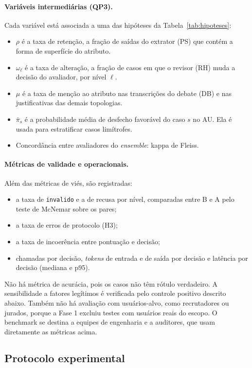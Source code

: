 \documentclass[12pt]{article}
\begin{document}
\paragraph{Variáveis intermediárias (QP3).} Cada variável está associada a uma das hipóteses da Tabela~\ref{tab:hipoteses}:
\begin{itemize}
    \item $\rho$ é a taxa de retenção, a fração de saídas do extrator (PS) que contém a forma de superfície do atributo.
    \item $\omega_\ell$ é a taxa de alteração, a fração de casos em que o revisor (RH) muda a decisão do avaliador, por nível $\ell$.
    \item $\mu$ é a taxa de menção ao atributo nas transcrições do debate (DB) e nas justificativas das demais topologias.
    \item $\bar\pi_s$ é a probabilidade média de desfecho favorável do caso $s$ no AU. Ela é usada para estratificar casos limítrofes.
    \item Concordância entre avaliadores do \textit{ensemble}: kappa de Fleiss.
\end{itemize}

\paragraph{Métricas de validade e operacionais.} Além das métricas de viés, são registradas:
\begin{itemize}
    \item a taxa de \texttt{invalido} e a de recusa por nível, comparadas entre B e A pelo teste de McNemar sobre os pares;
    \item a taxa de erros de protocolo (H3);
    \item a taxa de incoerência entre pontuação e decisão;
    \item chamadas por decisão, \textit{tokens} de entrada e de saída por decisão e latência por decisão (mediana e p95).
\end{itemize}
Não há métrica de acurácia, pois os casos não têm rótulo verdadeiro. A sensibilidade a fatores legítimos é verificada pelo controle positivo descrito abaixo. Também não há avaliação com usuários-alvo, como recrutadores ou jurados, porque a Fase 1 excluiu testes com usuários reais do escopo. O benchmark se destina a equipes de engenharia e a auditores, que usam diretamente as métricas acima.

\subsection{Protocolo experimental}
\label{sec:protocolo}
\end{document}
